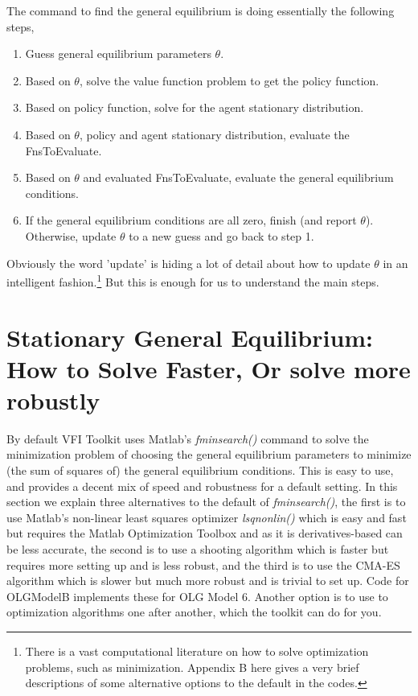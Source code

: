 The command to find the general equilibrium is doing essentially the following steps,
\begin{enumerate}
 \item Guess general equilibrium parameters $\theta$.
 \item Based on $\theta$, solve the value function problem to get the policy function.
 \item Based on policy function, solve for the agent stationary distribution.
 \item Based on $\theta$, policy and agent stationary distribution, evaluate the FnsToEvaluate.
 \item Based on $\theta$ and evaluated FnsToEvaluate, evaluate the general equilibrium conditions.
 \item If the general equilibrium conditions are all zero, finish (and report $\theta$). Otherwise, update $\theta$ to a new guess and go back to step 1.
\end{enumerate}
Obviously the word 'update' is hiding a lot of detail about how to update $\theta$ in an intelligent fashion.\footnote{There is a vast computational literature on how to solve optimization problems, such as minimization. Appendix B here gives a very brief descriptions of some alternative options to the default in the codes.} But this is enough for us to understand the main steps.


\section{Stationary General Equilibrium: How to Solve Faster, Or solve more robustly}
By default VFI Toolkit uses Matlab's \textit{fminsearch()} command to solve the minimization problem of choosing the general equilibrium parameters to minimize (the sum of squares of) the general equilibrium conditions. This is easy to use, and provides a decent mix of speed and robustness for a default setting. In this section we explain three alternatives to the default of \textit{fminsearch()}, the first is to use Matlab's non-linear least squares optimizer \textit{lsqnonlin()} which is easy and fast but requires the Matlab Optimization Toolbox and as it is derivatives-based can be less accurate, the second is to use a shooting algorithm which is faster but requires more setting up and is less robust, and the third is to use the CMA-ES algorithm which is slower but much more robust and is trivial to set up. Code for OLGModelB implements these for OLG Model 6. Another option is to use to optimization algorithms one after another, which the toolkit can do for you.

